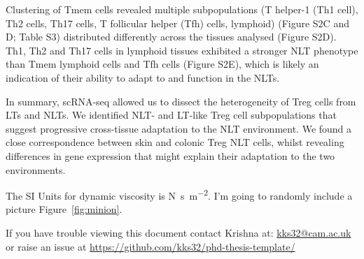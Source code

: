 Clustering of Tmem cells revealed multiple subpopulations (T helper-1 (Th1 cell), Th2 cells, Th17 cells, T follicular helper (Tfh) cells, lymphoid) (Figure S2C and D; Table S3) distributed differently across the tissues analysed (Figure S2D). Th1, Th2 and Th17 cells in lymphoid tissues exhibited a stronger NLT phenotype than Tmem lymphoid cells and Tfh cells (Figure S2E), which is likely an indication of their ability to adapt to and function in the NLTs.

In summary, scRNA-seq allowed us to dissect the heterogeneity of Treg cells from LTs and NLTs. We identified NLT- and LT-like Treg cell subpopulations that suggest progressive cross-tissue adaptation to the NLT environment. We found a close correspondence between skin and colonic Treg NLT cells, whilst revealing differences in gene expression that might explain their adaptation to the two environments.




The SI Units for dynamic viscosity is \si{\newton\second\per\metre\squared}.
I'm going to randomly include a picture Figure~\ref{fig:minion}.


If you have trouble viewing this document contact Krishna at: \href{mailto:kks32@cam.ac.uk}{kks32@cam.ac.uk} or raise an issue at \url{https://github.com/kks32/phd-thesis-template/}





